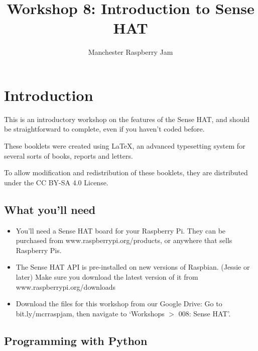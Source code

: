 \documentclass[a4paper, twocolumn, twoside, 12pt]{article}
\begin{document}
	\author{Manchester Raspberry Jam}
	\title{Workshop 8: Introduction to Sense HAT}
	\date{}

	\maketitle
	
	\setcounter{tocdepth}{1}
	\tableofcontents
	
\setcounter{section}{-1}
	\section{Introduction}
		This is an introductory workshop on the features of the Sense HAT, and should be straightforward to complete, even if you haven't coded before.
		
		These booklets were created using {\selectfont \LaTeX}, an advanced typesetting system for several sorts of books, reports and letters.
		
		To allow modification and redistribution of these booklets, they are distributed under the CC BY-SA 4.0 License.
	
	\subsection*{What you'll need}
		\begin{itemize}
			\item You'll need a Sense HAT board for your Raspberry Pi.
			\scriptsize\newline They can be purchased from \color{WildStrawberry}www.raspberrypi.org/products\color{black}, or anywhere that sells Raspberry Pis.
			\normalsize
			
			\item The Sense HAT API is pre-installed on new versions of Raspbian. (Jessie or later) 			
			\scriptsize\newline Make sure you download the latest version of it from \color{WildStrawberry}www.raspberrypi.org/downloads\color{black}
			\normalsize
			
			\item Download the files for this workshop from our Google Drive:
			\scriptsize\newline Go to \color{WildStrawberry}bit.ly/mcrraspjam\color{black}, then navigate to `Workshops $>$ 008: Sense HAT'.
			\normalsize
		\end{itemize}
	
	\subsection*{Programming with Python}
	
\end{document}
